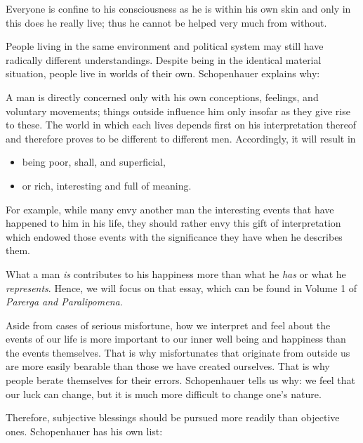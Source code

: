 \begin{quotex}
Everyone is confine to his consciousness as he is within his own skin and only in this does he really live; thus he
cannot be helped very much from without. 

\end{quotex}
People living in the same environment and political system may still have radically different understandings. Despite
being in the identical material situation, people live in worlds of their own. Schopenhauer explains why:

\begin{quotex}
A man is directly concerned only with his own conceptions, feelings, and voluntary movements; things outside influence
him only insofar as they give rise to these. The world in which each lives depends first on his interpretation thereof
and therefore proves to be different to different men. Accordingly, it will result in

\begin{itemize}
\item
being poor, shall, and superficial, 
\item
or rich, interesting and full of meaning. 
\end{itemize}

For example, while many envy another man the interesting events that have happened to him in his life, they should
rather envy this gift of interpretation which endowed those events with the significance they have when he describes
them. 

\end{quotex}

What a man \emph{is} contributes to his happiness more than what he \emph{has} or what he \emph{represents}. Hence, we
will focus on that essay, which can be found in Volume 1 of \emph{Parerga and Paralipomena}.

Aside from cases of serious misfortune, how we interpret and feel about the events of our life is more important to our
inner well being and happiness than the events themselves. That is why misfortunates that originate from outside us are
more easily bearable than those we have created ourselves. That is why people berate themselves for their errors.
Schopenhauer tells us why: we feel that our luck can change, but it is much more difficult to change one’s
nature.

Therefore, subjective blessings should be pursued more readily than objective ones. Schopenhauer has his own list:

